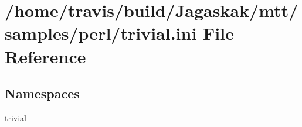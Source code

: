 \hypertarget{trivial_8ini}{\section{/home/travis/build/\-Jagaskak/mtt/samples/perl/trivial.ini File Reference}
\label{trivial_8ini}
}
\subsection*{Namespaces}
\begin{DoxyCompactItemize}
\item 
\hyperlink{namespacetrivial}{trivial}
\end{DoxyCompactItemize}
